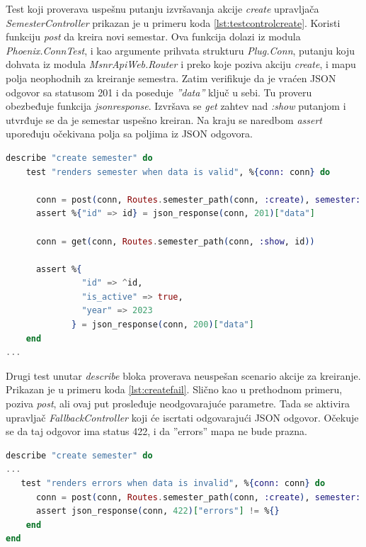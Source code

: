 \documentclass[12pt,oneside]{memoir}
\begin{document}
\par Test koji proverava uspešnu putanju izvršavanja akcije \emph{create} upravljača \emph{SemesterController} prikazan je u primeru koda \ref{lst:testcontrolcreate}. Koristi funkciju \emph{post} da kreira novi semestar. Ova funkcija dolazi iz modula \emph{Phoenix.ConnTest}, i kao argumente prihvata strukturu \emph{Plug.Conn}, putanju koju dohvata iz modula \emph{MsnrApiWeb.Router} i preko koje poziva akciju \emph{create}, i mapu polja neophodnih za kreiranje semestra. Zatim verifikuje da je vraćen JSON odgovor sa statusom 201 i da poseduje \emph{''data''} ključ u sebi. Tu proveru obezbeđuje funkcija \emph{json{\textunderscore}response}. Izvršava se \emph{get} zahtev nad \emph{:show} putanjom i utvrđuje se da je semestar uspešno kreiran. Na kraju se naredbom \emph{assert} upoređuju očekivana polja sa poljima iz JSON odgovora.

\begin{lstlisting}[language=elixir, caption={Testiranje akcije \emph{create} upravljača \emph{SemesterController}},captionpos=b, label={lst:testcontrolcreate}]
describe "create semester" do
    test "renders semester when data is valid", %{conn: conn} do

      conn = post(conn, Routes.semester_path(conn, :create), semester: @create_attrs)
      assert %{"id" => id} = json_response(conn, 201)["data"]

      conn = get(conn, Routes.semester_path(conn, :show, id))

      assert %{
               "id" => ^id,
               "is_active" => true,
               "year" => 2023
             } = json_response(conn, 200)["data"]
    end
...
\end{lstlisting}

\par Drugi test unutar \emph{describe} bloka proverava neuspešan scenario akcije za kreiranje. Prikazan je u primeru koda \ref{lst:createfail}. Slično kao u prethodnom primeru, poziva \emph{post}, ali ovaj put prosleđuje neodgovarajuće parametre. Tada se aktivira upravljač \emph{FallbackController} koji će iscrtati odgovarajući JSON odgovor. Očekuje se da taj odgovor ima status 422, i da ''errors'' mapa ne bude prazna. 

\begin{lstlisting}[language=elixir, caption={Testiranje akcije \emph{create} upravljača \emph{SemesterController}},captionpos=b, label={lst:createfail}]
describe "create semester" do
...
   test "renders errors when data is invalid", %{conn: conn} do
      conn = post(conn, Routes.semester_path(conn, :create), semester: @invalid_attrs)
      assert json_response(conn, 422)["errors"] != %{}
    end
end
\end{lstlisting}
\end{document}
